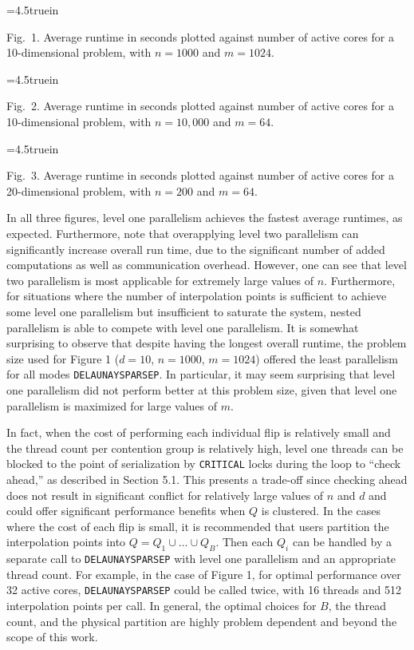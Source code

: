 {\topinsert
\centerline{\epsfxsize=4.5truein }
{\narrower\noindent\rmVIII Fig.\ 1.
Average runtime in seconds plotted against number of active cores
for a 10-dimensional problem, with $n=1000$ and $m=1024$.
\par}
\endinsert

\midinsert
\centerline{\epsfxsize=4.5truein }
{\narrower\noindent\rmVIII Fig.\ 2.
Average runtime in seconds plotted against number of active cores
for a 10-dimensional problem, with $n=10,000$ and $m=64$.
\par}
\endinsert

\midinsert
\centerline{\epsfxsize=4.5truein }
{\narrower\noindent\rmVIII Fig.\ 3.
Average runtime in seconds plotted against number of active cores
for a 20-dimensional problem, with $n=200$ and $m=64$.
\par}
\endinsert

In all three figures, level one parallelism achieves the fastest average
runtimes, as expected. Furthermore, note that overapplying level two
parallelism can significantly increase overall run time, due to the
significant number of added computations as well as communication overhead.
However, one can see that level two parallelism is most applicable for
extremely large values of $n$. Furthermore, for situations where the
number of interpolation points is sufficient to achieve some level one
parallelism but insufficient to saturate the system,
nested parallelism is able to compete with level one parallelism.
It is somewhat surprising to observe that despite having the longest
overall runtime, the problem size used for Figure 1 ($d=10$, $n=1000$, 
$m=1024$) offered the least parallelism for all modes {\tt DELAUNAYSPARSEP}.
In particular, it may seem surprising that level one parallelism did not
perform better at this problem size, given that level one parallelism
is maximized for large values of $m$.

In fact, when the cost of performing each individual flip is relatively
small and the thread count per contention group is relatively high, level
one threads can be blocked to the point of serialization by {\tt CRITICAL}
locks during the loop to ``check ahead,'' as described in Section 5.1. This
presents a trade-off since checking ahead does not result in significant
conflict for relatively large values of $n$ and $d$ and could offer
significant performance benefits when $Q$ is clustered. In the cases
where the cost of each flip is small, it is recommended that users
partition the interpolation points into
$Q = Q_1 \cup \ldots \cup Q_B$. Then each $Q_i$ can be handled by a
separate call to {\tt DELAUNAYSPARSEP} with level one parallelism
and an appropriate thread count.
For example, in the case of Figure 1, for optimal performance over
32 active cores, {\tt DELAUNAYSPARSEP} could be called twice, with 16
threads and 512 interpolation points per call.
In general, the optimal choices for $B$, the thread count, and the
physical partition are highly problem dependent and beyond the scope
of this work.

}
